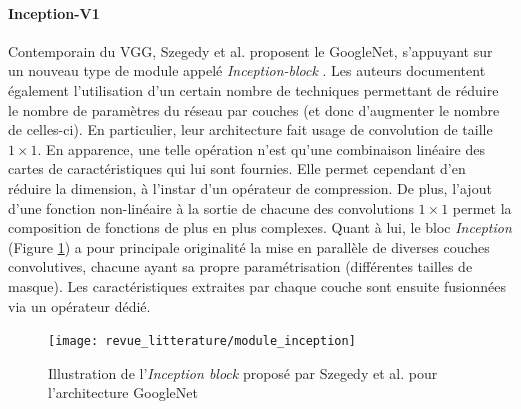 \paragraph{Inception-V1}
Contemporain du VGG, Szegedy et al. proposent le GoogleNet, s'appuyant sur un nouveau type de module appelé \textit{Inception-block} \cite{szegedyGoingDeeperConvolutions2015a}. Les auteurs documentent également l'utilisation d'un certain nombre de techniques permettant de réduire le nombre de paramètres du réseau par couches (et donc d'augmenter le nombre de celles-ci). En particulier, leur architecture fait usage de convolution de taille $1 \times 1$. En apparence, une telle opération n'est qu'une combinaison linéaire des cartes de caractéristiques qui lui sont fournies. Elle permet cependant d'en réduire la dimension, à l'instar d'un opérateur de compression. De plus, l'ajout d'une fonction non-linéaire à la sortie de chacune des convolutions $1 \times 1$ permet la composition de fonctions de plus en plus complexes.
Quant à lui, le bloc \textit{Inception} (Figure \ref{fig:InceptionBlock}) a pour principale originalité la mise en parallèle de diverses couches convolutives, chacune ayant sa propre paramétrisation (différentes tailles de masque). Les caractéristiques extraites par chaque couche sont ensuite fusionnées via un opérateur dédié.

\begin{figure}[htb]
	\centering
	\texttt{[image: revue\_litterature/module\_inception]}
	\caption{Illustration de l'\textit{Inception block} proposé par Szegedy et al. pour l'architecture GoogleNet \cite{szegedyGoingDeeperConvolutions2015a}}
	\label{fig:InceptionBlock}
\end{figure}

